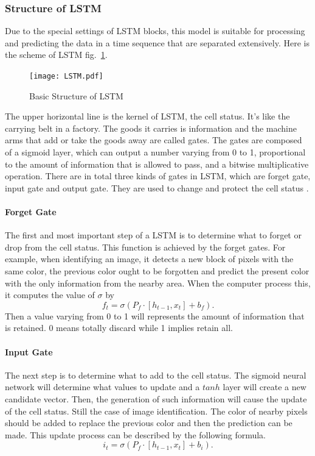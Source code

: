 \documentclass{mcmthesis}
\begin{document}
\subsubsection{Structure of LSTM}
Due to the special settings of LSTM blocks, this model is suitable for processing and predicting the data in a time sequence that are separated extensively. Here is the scheme of LSTM fig.~\ref{fig:LSTM}.

\begin{figure}[!htbp]
	\centering
 	\texttt{[image: LSTM.pdf]} 
	\caption{Basic Structure of LSTM}
	\label{fig:LSTM}
\end{figure}

The upper horizontal line is the kernel of LSTM, the cell status. It's like the carrying belt in a factory. The goods it carries is information and the machine arms that add or take the goods away are called gates. The gates are composed of a sigmoid layer, which can output a number varying from 0 to 1, proportional to the amount of information that is allowed to pass, and a bitwise multiplicative operation. There are in total three kinds of gates in LSTM, which are forget gate, input gate and output gate. They are used to change and protect the cell status \cite{LSTM}.

\paragraph{Forget Gate}
The first and most important step of a LSTM is to determine what to forget or drop from the cell status. This function is achieved by the forget gates. For example, when identifying an image, it detects a new block of pixels with the same color, the previous color ought to be forgotten and predict the present color with the only information from the nearby area. When the computer process this, it computes the value of $\sigma$ by
\begin{equation}
	f_{t}=\sigma(P_{f}\cdot [h_{t-1}, x_{t}]+b_{f}).
\end{equation}
Then a value varying from 0 to 1 will represents the amount of information that is retained. 0 means totally discard while 1 implies retain all.

\paragraph{Input Gate}
The next step is to determine what to add to the cell status. The sigmoid neural network will determine what values to update and a $tanh$ layer will create a new candidate vector. Then, the generation of such information will cause the update of the cell status. Still the case of image identification. The color of nearby pixels should be added to replace the previous color and then the prediction can be made. This update process can be described by the following formula.
\begin{equation}
	i_{t}=\sigma(P_{f}\cdot [h_{t-1}, x_{t}]+b_{i}).
\end{equation}
\end{document}

